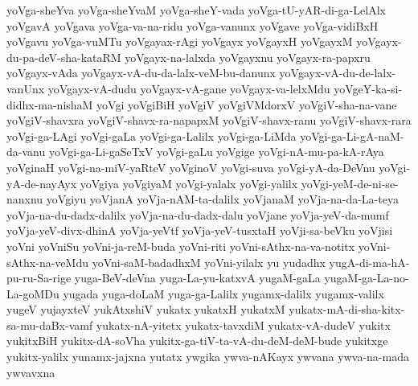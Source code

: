 {yoVga-sheYva
yoVga-sheYvaM
yoVga-sheY-vada
yoVga-tU-yAR-di-ga-LelAlx
yoVgavA
yoVgava
yoVga-va-na-ridu
yoVga-vanunx
yoVgave
yoVga-vidiBxH
yoVgavu
yoVga-vuMTu
yoVgayax-rAgi
yoVgayx
yoVgayxH
yoVgayxM
yoVgayx-du-pa-deV-sha-kataRM
yoVgayx-na-lalxda
yoVgayxnu
yoVgayx-ra-papxru
yoVgayx-vAda
yoVgayx-vA-du-da-lalx-veM-bu-danunx
yoVgayx-vA-du-de-lalx-vanUnx
yoVgayx-vA-dudu
yoVgayx-vA-gane
yoVgayx-va-lelxMdu
yoVgeY-ka-si-didhx-ma-nishaM
yoVgi
yoVgiBiH
yoVgiV
yoVgiVMdorxV
yoVgiV-sha-na-vane
yoVgiV-shavxra
yoVgiV-shavx-ra-napapxM
yoVgiV-shavx-ranu
yoVgiV-shavx-rara
yoVgi-ga-LAgi
yoVgi-gaLa
yoVgi-ga-Lalilx
yoVgi-ga-LiMda
yoVgi-ga-Li-gA-naM-da-vanu
yoVgi-ga-Li-gaSeTxV
yoVgi-gaLu
yoVgige
yoVgi-nA-mu-pa-kA-rAya
yoVginaH
yoVgi-na-miV-yaRteV
yoVginoV
yoVgi-suva
yoVgi-yA-da-DeVnu
yoVgi-yA-de-nayAyx
yoVgiya
yoVgiyaM
yoVgi-yalalx
yoVgi-yalilx
yoVgi-yeM-de-ni-se-nanxnu
yoVgiyu
yoVjanA
yoVja-nAM-ta-dalilx
yoVjanaM
yoVja-na-da-La-teya
yoVja-na-du-dadx-dalilx
yoVja-na-du-dadx-dalu
yoVjane
yoVja-yeV-da-mumf
yoVja-yeV-divx-dhinA
yoVja-yeVtf
yoVja-yeV-tusxtaH
yoVji-sa-beVku
yoVjisi
yoVni
yoVniSu
yoVni-ja-reM-buda
yoVni-riti
yoVni-sAthx-na-va-notitx
yoVni-sAthx-na-veMdu
yoVni-saM-badadhxM
yoVni-yilalx
yu
yudadhx
yugA-di-ma-hA-pu-ru-Sa-rige
yuga-BeV-deVna
yuga-La-yu-katxvA
yugaM-gaLa
yugaM-ga-La-no-La-goMDu
yugada
yuga-doLaM
yuga-ga-Lalilx
yugamx-dalilx
yugamx-valilx
yugeV
yujayxteV
yukAtxshiV
yukatx
yukatxH
yukatxM
yukatx-mA-di-sha-kitx-sa-mu-daBx-vamf
yukatx-nA-yitetx
yukatx-tavxdiM
yukatx-vA-dudeV
yukitx
yukitxBiH
yukitx-dA-soVha
yukitx-ga-tiV-ta-vA-du-deM-deM-bude
yukitxge
yukitx-yalilx
yunamx-jajxna
yutatx
ywgika
ywva-nAKayx
ywvana
ywva-na-mada
ywvavxna
}
